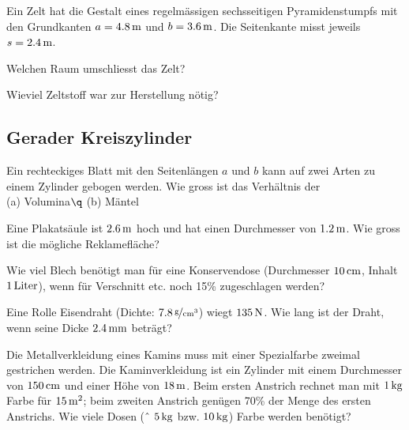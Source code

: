 \documentclass[%
11pt,%
twoside,%
titlepage,%
german,%
headsepline%
]{scrartcl}
\begin{document}
\begin{ueb}
Ein Zelt hat die Gestalt eines regelm\"assigen sechsseitigen Pyramidenstumpfs mit den Grundkanten $a=\unit[4.8]{m}$ und $b=\unit[3.6]{m}$. Die Seitenkante misst jeweils $s=\unit[2.4]{m}$.
\begin{enumeratea}
\item Welchen Raum umschliesst das Zelt?
\item Wieviel Zeltstoff war zur Herstellung n\"otig?
\end{enumeratea}
\end{ueb}

\subsection{Gerader Kreiszylinder}
\begin{ueb}
Ein rechteckiges Blatt mit den Seitenl\"angen $a$ und $b$ kann auf zwei Arten zu einem Zylinder gebogen werden. Wie gross ist das Verh\"altnis der \\[1ex]
\hspace*{2.7ex}(a) Volumina$\q$ (b) M\"antel
\end{ueb}

\begin{ueb}
Eine Plakats\"aule ist $\unit[2.6]{m}$ hoch und hat einen Durchmesser von $\unit[1.2]{m}$. Wie gross ist die m\"ogliche Reklamefl\"ache?
\end{ueb}

\begin{ueb}
Wie viel Blech ben\"otigt man f\"ur eine Konservendose (Durchmesser $\unit[10]{cm}$, Inhalt $\unit[1]{Liter}$), wenn f\"ur Verschnitt etc. noch 15\% zugeschlagen werden?
\end{ueb}

\begin{ueb}
Eine Rolle Eisendraht (Dichte: $\unitfrac[7.8]{g}{cm^3}$) wiegt $\unit[135]{N}$. Wie lang ist der Draht, wenn seine Dicke $\unit[2.4]{mm}$ betr\"agt?
\end{ueb}

\begin{ueb}
Die Metallverkleidung eines Kamins muss mit einer Spezialfarbe zweimal gestrichen werden. Die Kaminverkleidung ist ein Zylinder mit einem Durchmesser von $\unit[150]{cm}$ und einer H\"ohe von $\unit[18]{m}$. Beim ersten Anstrich rechnet man mit $\unit[1]{kg}$ Farbe f\"ur $\unit[15]{m^2}$; beim zweiten Anstrich gen\"ugen 70\% der Menge des ersten Anstrichs. Wie viele Dosen (ˆ $\unit[5]{kg}$ bzw. $\unit[10]{kg}$) Farbe werden ben\"otigt?
\end{ueb}
\end{document}
